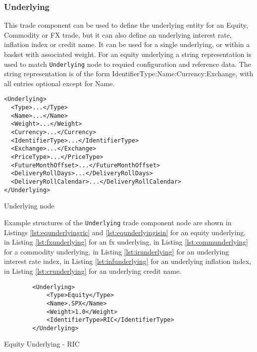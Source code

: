 \subsubsection{Underlying}
\label{ss:underlying}

This trade component can be used to define the underlying entity for an Equity, Commodity or FX trade, but it can also define an underlying interest rate, inflation index or credit name. It can be used for a single underlying, or within a basket with associated weight.
For an equity underlying a string representation is used to match \lstinline!Underlying! node to requied configuration and reference data. The string representation is of the form {IdentifierType}:{Name}:{Currency}:{Exchange}, with all entries optional except for Name.

\begin{listing}[H]
\begin{verbatim}
<Underlying>
  <Type>...</Type>
  <Name>...</Name>
  <Weight>...</Weight>
  <Currency>...</Currency>
  <IdentifierType>...</IdentifierType>
  <Exchange>...</Exchange>
  <PriceType>...</PriceType>
  <FutureMonthOffset>...</FutureMonthOffset>
  <DeliveryRollDays>...</DeliveryRollDays>
  <DeliveryRollCalendar>...</DeliveryRollCalendar>
</Underlying>
\end{verbatim}
\caption{Underlying node}
\label{lst:underlying}
\end{listing}

Example structures of the \lstinline!Underlying! trade component node are shown in Listings \ref{lst:equnderlyingric} and \ref{lst:equnderlyingisin} for
an equity underlying, in Listing \ref{lst:fxunderlying} for an fx underlying, in Listing \ref{lst:communderlying} for
a commodity underlying, in Listing \ref{lst:irunderlying} for an underlying interest rate index, in Listing \ref{lst:infunderlying} for an underlying inflation index, in Listing \ref{lst:crunderlying} for an underlying credit name.  

\begin{listing}[H]
\begin{verbatim}
        <Underlying>
            <Type>Equity</Type>
            <Name>.SPX</Name>
            <Weight>1.0</Weight>
            <IdentifierType>RIC</IdentifierType>
        </Underlying>
\end{verbatim}
\caption{Equity Underlying - RIC}
\label{lst:equnderlyingric}
\end{listing}


